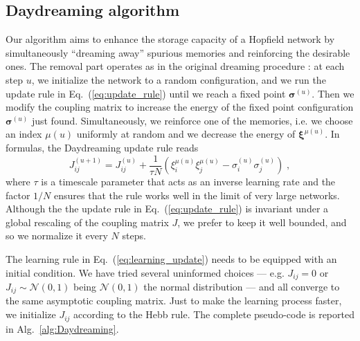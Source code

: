 \documentclass[a4paper]{cas-sc}
\newcommand{\bxi}{\boldsymbol{\xi}}
\newcommand{\bsigma}{\boldsymbol{\sigma}}
\begin{document}
\subsection{Daydreaming algorithm}

Our algorithm aims to enhance the storage capacity of a Hopfield network by simultaneously ``dreaming away'' spurious memories and reinforcing the desirable ones.
The removal part operates as in the original dreaming procedure \cite{Hopfield1983}: at each step $u$, we initialize the network to a random configuration,  and we run the update rule in Eq.~(\ref{eq:update_rule}) until we reach a fixed point $\bsigma^{(u)}$. Then we modify the coupling matrix to increase the energy of the fixed point configuration $\bsigma^{(u)}$ just found. Simultaneously, we reinforce one of the memories, i.e. we choose an index $\mu(u)$ uniformly at random and we decrease the energy of $\bxi^{\mu(u)}$.
In formulas, the Daydreaming update rule reads
\begin{equation}
    J^{(u+1)}_{ij}=J^{(u)}_{ij}+\frac{1}{\tau N} \left(\xi_i^{\mu(u)} \xi_j^{\mu(u)}-\sigma_i^{(u)}\sigma_j^{(u)}\right)\; ,
    \label{eq:learning_update}
\end{equation}
where $\tau$ is a timescale parameter that acts as an inverse learning rate and the factor $1/N$ ensures that the rule works well in the limit of very large networks. Although the the update rule in Eq.~(\ref{eq:update_rule}) is invariant under a global rescaling of the coupling matrix $J$, we prefer to keep it well bounded, and so we normalize it every $N$ steps.

The learning rule in Eq.~(\ref{eq:learning_update}) needs to be equipped with an initial condition. We have tried several uninformed choices --- e.g. $J_{ij}=0$ or $J_{ij}\sim \mathcal{N}(0,1)$ being $\mathcal{N}(0,1)$ the normal distribution --- and all converge to the same asymptotic coupling matrix. Just to make the learning process faster, we initialize $J_{ij}$ according to the Hebb rule.
The complete pseudo-code is reported in Alg.~\ref{alg:Daydreaming}.
\end{document}
